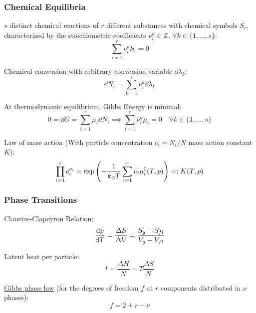 		\subsubsection{Chemical Equilibria}
			\noindent
			$s$ distinct chemical reactions of $r$ different substances with chemical symbols $S_i$, characterized by the stoichiometric coefficients $\nu_i^k\in\mathbb{Z}$, $\forall k\in\lbrace1,...,s\rbrace$:
			\begin{equation}
				\sum_{i=1}^r \nu_i^k S_i = 0
			\end{equation}

			\noindent
			Chemical conversion with arbitrary conversion variable $\dd \lambda_k$:
			\begin{equation}
				\dd N_i = \sum_{k=1}^s \nu_i^k \dd \lambda_k
			\end{equation}

			\noindent
			At thermodynamic equilibrium, Gibbs Energy is minimal:
			\begin{equation}
				0 = \dd G = \sum_{i=1}^r \mu_i \dd N_i \implies \sum_{i=1}^r \nu_i^k \mu_i = 0 \quad\forall k\in\lbrace1,...,s\rbrace
			\end{equation}

			\noindent
			Law of mass action (With particle concentration $c_i = N_i/N$ mass action constant $K$):
			\begin{equation}
				\prod_{i=1}^r	c_i^{\nu_i} = \exp\left( -\frac{1}{k_{\text{B}} T}\sum_{i=1}^r \nu_i\mu_i^0(T,p) \right) =: K(T,p)
			\end{equation}

		\subsubsection{Phase Transitions}
			\noindent
			Clausius-Clapeyron Relation:
			\begin{equation}
				\dv{p}{T} = \frac{\Delta S}{\Delta V} = \frac{S_g - S_{fl}}{V_g - V_{fl}}
			\end{equation}

			\noindent
			Latent heat per particle:
			\begin{equation}
				l = \frac{\Delta H}{N} = T\frac{\Delta S}{N}
			\end{equation}

			\noindent
			\href{https://en.wikipedia.org/wiki/Phase_rule}{Gibbs phase law} (for the degrees of freedom $f$ at $r$ components distributed in $\nu$ phases):
			\begin{equation}
				f = 2 + r - \nu
			\end{equation}


